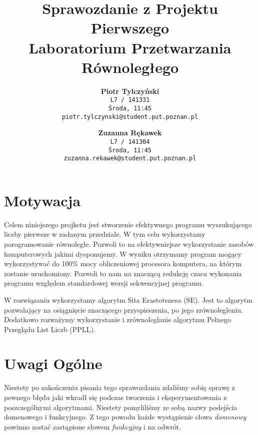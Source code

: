 \documentclass{article}
\begin{document}
    \title{
        Sprawozdanie z Projektu Pierwszego \\
        \small{Laboratorium Przetwarzania Równoległego}
    }
    \author{
        \textbf{Piotr Tylczyński}\\
        \texttt{L7 / 141331} \\
        \texttt{Środa, 11:45} \\
        \texttt{piotr.tylczynski@student.put.poznan.pl}
        \and
        \textbf{Zuzanna Rękawek}\\
        \texttt{L7 / 141304} \\
        \texttt{Środa, 11:45} \\
        \texttt{zuzanna.rekawek@student.put.poznan.pl}
        \date{}
        }
    \begin{titlepage}
        \maketitle
        \hfill \break
            
            
    \end{titlepage}
    
    \tableofcontents
    \pagebreak
    
    \section{Motywacja}
        Celem niniejszego projketu jest stworzenie efektywnego programu wyszukującego liczby pierwsze w zadanym przedziale. W tym celu wykorzystamy porogramowanie równoległe. Pozwoli to na efektywniejsze wykorzystanie zasobów komputerowych jakimi dysponujemy. W wyniku otrzymamy program mogący wykorzystywać do 100\% mocy obliczeniowej procesora komputera, na którym zostanie uruchomiony. Pozwoli to nam na znaczącą redukcję czasu wykonania programu względem standardowej wersji sekwencyjnej programu.
        
        W rozwiązaniu wykorzystamy algorytm Sita Erastotenesa (\gls{SE}). Jest to algorytm pozwalający na osiągnięcie znaczącego przyspieszenia, po jego zrównolegleniu. Dodatkowo rozważymy wykorzystanie i zrównoleglanie algorytmu Pełnego Przeglądu List Liczb (\gls{PPLL}).
                 
    \section{Uwagi Ogólne}
        Niestety po zakończeniu pisania tego sprawozdania zdaliśmy sobię sprawę z pewnego błędu jaki wkradł się podczas tworzenia i eksperymentowania z poszczególnymi algorytmami. Niestety pomyliliśmy ze sobą nazwy podejścia domenowego i funkcyjnego. Z tego powodu każde wystąpienie słowa \emph{domenowy} powinno zostać zastąpione słowem \emph{funkcyjny} i na odwrót.
        
\end{document}
